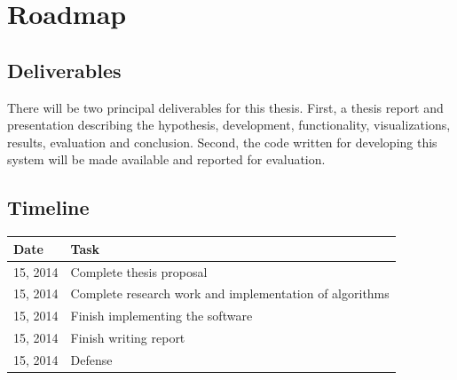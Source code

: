 \section{Roadmap}

\subsection{Deliverables}

There will be two principal deliverables for this thesis. First, a thesis report and presentation describing the hypothesis, development, functionality, visualizations, results, evaluation and conclusion.  Second,  the code written for developing this system will be made available and reported for evaluation.    



\subsection {Timeline}


\begin{table}[h]
\centering
\begin{tabular}{l|l}
Date & Task \\ \hline
  15, 2014   & Complete thesis proposal   \\
 15, 2014   & Complete research work and implementation of algorithms  \\
 15, 2014   & Finish implementing the software \\
 15, 2014 & Finish writing report \\
 15, 2014 & Defense \\
\end{tabular}
\end{table}


\pagebreak







